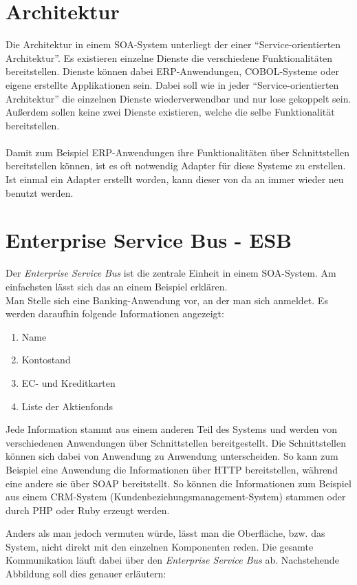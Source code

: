 \section{Architektur}
\label{sec:SoaArchitektur}
Die Architektur in einem SOA-System unterliegt der einer "`Service-orientierten Architektur"'. Es existieren einzelne Dienste die verschiedene Funktionalitäten bereitstellen. Dienste können dabei ERP-Anwendungen, COBOL-Systeme oder eigene erstellte Applikationen sein. Dabei soll wie in jeder "`Service-orientierten Architektur"' die einzelnen Dienste wiederverwendbar und nur lose gekoppelt sein. Außerdem sollen keine zwei Dienste existieren, welche die selbe Funktionalität bereitstellen.
\\\\
Damit zum Beispiel ERP-Anwendungen ihre Funktionalitäten über Schnittstellen bereitstellen können, ist es oft notwendig Adapter für diese Systeme zu erstellen. Ist einmal ein Adapter erstellt worden, kann dieser von da an immer wieder neu benutzt werden.

\section{Enterprise Service Bus - ESB}
\label{sec:esb}
Der \textit{Enterprise Service Bus} ist die zentrale Einheit in einem SOA-System. Am einfachsten lässt sich das an einem Beispiel erklären.
\\
Man Stelle sich eine Banking-Anwendung vor, an der man sich anmeldet. Es werden daraufhin folgende Informationen angezeigt:

\begin{enumerate}
    \item Name
    \item Kontostand
    \item EC- und Kreditkarten
    \item Liste der Aktienfonds
\end{enumerate}

Jede Information stammt aus einem anderen Teil des Systems und werden von verschiedenen Anwendungen über Schnittstellen bereitgestellt. Die Schnittstellen können sich dabei von Anwendung zu Anwendung unterscheiden. So kann zum Beispiel eine Anwendung die Informationen über HTTP bereitstellen, während eine andere sie über SOAP bereitstellt. So können die Informationen zum Beispiel aus einem CRM-System (Kundenbeziehungsmanagement-System) stammen oder durch PHP oder Ruby erzeugt werden.

Anders als man jedoch vermuten würde, lässt man die Oberfläche, bzw. das System, nicht direkt mit den einzelnen Komponenten reden. Die gesamte Kommunikation läuft dabei über den \textit{Enterprise Service Bus} ab. Nachstehende Abbildung soll dies genauer erläutern:

